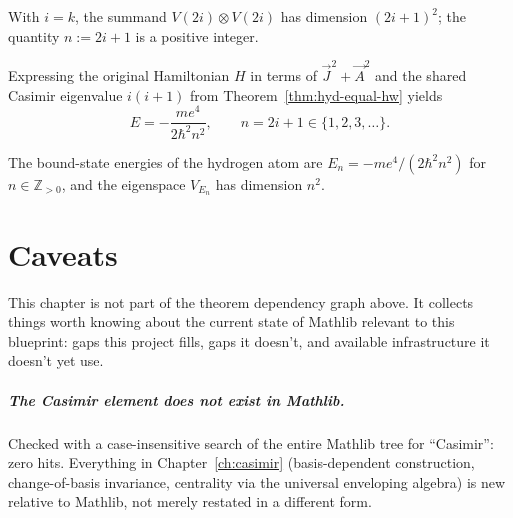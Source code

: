 \begin{theorem}
  \label{thm:hyd-dimension}
  \leanok
  With $i=k$, the summand $V(2i)\otimes V(2i)$ has dimension $(2i+1)^2$; the
  quantity $n := 2i+1$ is a positive integer.
\end{theorem}

\begin{theorem}
  \label{thm:hyd-quadratic-energy}
  \leanok
  Expressing the original Hamiltonian $H$ in terms of $\vec J^2 + \vec A^2$
  and the shared Casimir eigenvalue $i(i+1)$ from
  Theorem~\ref{thm:hyd-equal-hw} yields
  \[
    E = -\frac{me^4}{2\hbar^2 n^2}, \qquad n = 2i+1 \in \{1,2,3,\dots\}.
  \]
\end{theorem}

\begin{theorem}
  \label{thm:hyd-energy-degeneracy}
  \leanok
  The bound-state energies of the hydrogen atom are
  $E_n = -me^4/(2\hbar^2 n^2)$ for $n \in \mathbb{Z}_{>0}$, and the
  eigenspace $V_{E_n}$ has dimension $n^2$.
\end{theorem}

\chapter*{Caveats}

This chapter is not part of the theorem dependency graph above. It collects
things worth knowing about the current state of Mathlib relevant to this
blueprint: gaps this project fills, gaps it doesn't, and available
infrastructure it doesn't yet use.

\paragraph{The Casimir element does not exist in Mathlib.} Checked with a
case-insensitive search of the entire Mathlib tree for ``Casimir'': zero
hits. Everything in Chapter~\ref{ch:casimir} (basis-dependent construction,
change-of-basis invariance, centrality via the universal enveloping algebra)
is new relative to Mathlib, not merely restated in a different form.

